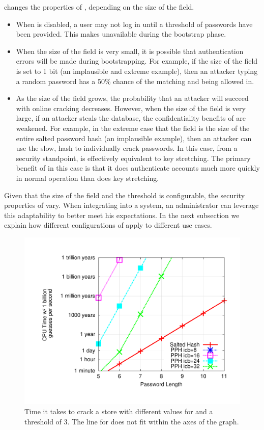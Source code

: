 \Partialverification changes the properties of \PPH, depending on the
size of the \partialbytes field.  
\begin{itemize}

\item When \partialverification is disabled, a user may not log in until a
threshold of \thresholdaccount passwords have been provided.  This makes \PPH
unavailable during the bootstrap phase.  

\item When the size of the \partialbytes field is very small, 
it is possible that authentication errors will be made during bootstrapping.
For example, if the size of the \partialbytes field is set to 1 bit (an
implausible and extreme example), then an attacker typing a random password 
has a 50\% chance of the \partialbytes matching and being allowed in.

\item  As the size of the \partialbytes field grows, the probability that an
attacker will succeed with online cracking decreases. However, when the size of the
\partialbytes field is very large, if an attacker steals the database, the
confidentiality benefits of \PPH are weakened.  For example, in the extreme
case that the \partialbytes field is the size of the entire salted password
hash (an implausible example), then an attacker can use the slow,
\partialverification hash to individually crack passwords.  In this case, from
a security standpoint, \PPH is effectively equivalent to key stretching.  The
primary benefit of \PPH in this case is that it does authenticate accounts much
more quickly in normal operation than does key stretching.

\end{itemize}

Given that the size of the \partialbytes field and the threshold is
configurable, the security properties of \PPH vary. When integrating \PPH into
a system, an administrator can leverage this adaptability to better meet his
expectations.  In the next subsection we explain how different configurations 
of \PPH apply to different use cases.


\begin{figure}
    \centering
    \includegraphics[width=.5\linewidth, trim=195 55 165 55]{./images/plotcrack_icb}
    \caption{{\small Time it takes to crack a \PPH store with different values
    for \partialbytes and a threshold of 3.  The line for 
does not fit within the axes of the graph. }}
    \label{FIGURE:cracking-icb}
\end{figure}




